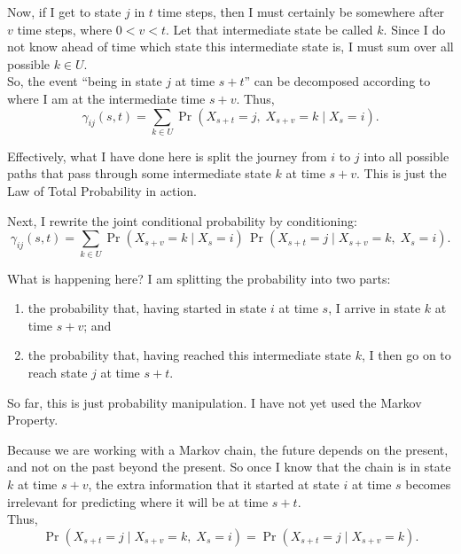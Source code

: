 \documentclass[12pt]{article}
\begin{document}
\vspace{0.3cm}

Now, if I get to state $j$ in $t$ time steps, then I must certainly be somewhere after $v$ time steps, where $0<v<t$. Let that intermediate state be called $k$. Since I do not know ahead of time which state this intermediate state is, I must sum over all possible $k\in U$.\\

So, the event ``being in state $j$ at time $s+t$'' can be decomposed according to where I am at the intermediate time $s+v$. Thus,
\[
\gamma_{ij}(s,t)
=
\sum_{k\in U}\Pr(X_{s+t}=j,\;X_{s+v}=k\mid X_s=i).
\]

Effectively, what I have done here is split the journey from $i$ to $j$ into all possible paths that pass through some intermediate state $k$ at time $s+v$. This is just the Law of Total Probability in action.\\

\vspace{0.3cm}

Next, I rewrite the joint conditional probability by conditioning:
\[
\gamma_{ij}(s,t)
=
\sum_{k\in U}
\Pr(X_{s+v}=k\mid X_s=i)\,
\Pr(X_{s+t}=j\mid X_{s+v}=k,\;X_s=i).
\]

What is happening here? I am splitting the probability into two parts:

\begin{enumerate}
    \item the probability that, having started in state $i$ at time $s$, I arrive in state $k$ at time $s+v$; and
    \item the probability that, having reached this intermediate state $k$, I then go on to reach state $j$ at time $s+t$.
\end{enumerate}

So far, this is just probability manipulation. I have not yet used the Markov Property.\\

\vspace{0.3cm}

Because we are working with a Markov chain, the future depends on the present, and not on the past beyond the present. So once I know that the chain is in state $k$ at time $s+v$, the extra information that it started at state $i$ at time $s$ becomes irrelevant for predicting where it will be at time $s+t$.\\

Thus,
\[
\Pr(X_{s+t}=j\mid X_{s+v}=k,\;X_s=i)
=
\Pr(X_{s+t}=j\mid X_{s+v}=k).
\]\\
\end{document}
